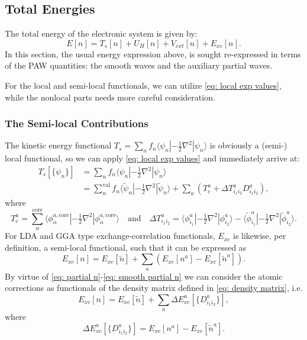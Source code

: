 \documentclass[a4paper]{article}
\newcommand{\s}[1]{\tilde{#1}}
\newcommand{\bra}[1]{\langle #1 |}
\newcommand{\ket}[1]{| #1 \rangle}
\begin{document}
\subsection{Total Energies}\label{sec: total energies}
The total energy of the electronic system is given by:
%
\begin{equation}
E[n] = T_s[n]+U_H[n]+V_{ext}[n]+E_{xc}[n].
\end{equation}
%
In this section, the usual energy expression above, is sought
re-expressed in terms of the PAW quantities: the smooth waves and the
auxiliary partial waves.
\par For the local and semi-local functionals, we can utilize
\ref{eq: local exp values}, while the nonlocal parts needs more
careful consideration.

\subsubsection{The Semi-local Contributions}
\par The kinetic energy functional $T_s = \sum_n f_n \bra{\psi_n}
-\frac{1}{2}\nabla^2\ket{\psi_n}$ is obviously a (semi-) local
functional, so we can apply \ref{eq: local exp values} and
immediately arrive at:
%
\begin{equation}
  \begin{split}
    T_s[\{\psi_n\}] &= \sum_n f_n \bra{\psi_n} -\tfrac{1}{2}\nabla^2\ket{\psi_n}\\
    &= \sum_n^\text{val} f_n \bra{\s{\psi}_n} - \tfrac{1}{2} \nabla^2\ket{\s{\psi}_n} + \sum_a \left(T_c^a + \Delta T_{i_1i_2}^a D^a_{i_1i_2} \right),
  \end{split}
\end{equation}
%
where
%
\begin{equation}
  T_c^a = \sum_\alpha^\text{core} \bra{\phi_\alpha^{a,\text{core}}} - \tfrac{1}{2}\nabla^2 \ket{\phi_\alpha^{a,\text{core}}} \quad \text{and} \quad \Delta T_{i_1i_2}^a = \bra{\phi_{i_1}^{a}} - \tfrac{1}{2}\nabla^2\ket{\phi_{i_2}^a} - \bra{\s{\phi}_{i_1}^{a}} - \tfrac{1}{2} \nabla^2 \ket{\s{\phi}_{i_2}^a}.
\end{equation}
%
For LDA and GGA type exchange-correlation functionals, $E_{xc}$ is
likewise, per definition, a semi-local functional, such that it can be
expressed as
%
\begin{equation}
  E_{xc}[n] =   E_{xc}[\s{n}] + \sum_a \left( E_{xc}[n^a] - E_{xc}[\s{n}^a] \right).
\end{equation}
%
By virtue of \ref{eq: partial n}-\ref{eq: smooth partial n} we can
consider the atomic corrections as functionals of the density matrix
defined in \ref{eq: density matrix}, i.e.
%
\begin{equation}
  E_{xc}[n] =   E_{xc}[\s{n}] + \sum_a \Delta E_{xc}^a[\{D^a_{i_1i_2}\}],
\end{equation}
%
where
%
\begin{equation}
  \Delta E_{xc}^a[\{D^a_{i_1i_2}\}] = E_{xc}[n^a] - E_{xc}[\s{n}^a].
\end{equation}
%
\end{document}
